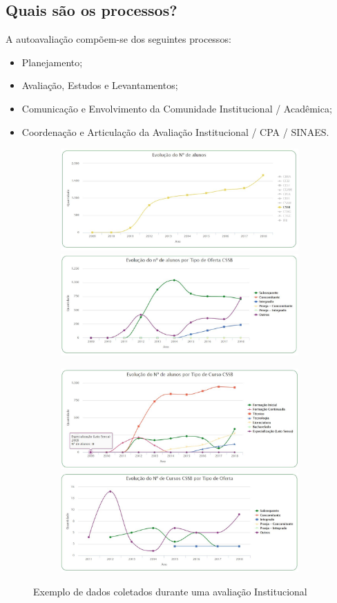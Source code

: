 \documentclass[final]{beamer}
\begin{document}
\begin{poster}
\section{Quais são os processos?}
A autoavaliação compõem-se dos seguintes processos:
\begin{itemize}
	\item Planejamento;
	\item Avaliação, Estudos e Levantamentos;
	\item Comunicação e Envolvimento da Comunidade Institucional / Acadêmica;
	\item Coordenação e Articulação da Avaliação Institucional / CPA / SINAES.
\end{itemize}

\begin{figure}%
\begin{subfigure}{\textwidth}
\centering
\includegraphics[width=.45\columnwidth]{alunos}
\includegraphics[width=.45\columnwidth]{oferta}
\end{subfigure}
\begin{subfigure}{\textwidth}
\centering
\includegraphics[width=.45\columnwidth]{tipo}
\includegraphics[width=.45\columnwidth]{cursos}
\end{subfigure}
\caption{Exemplo de dados coletados durante uma avaliação Institucional}
\end{figure}


\end{poster}
\end{document}
